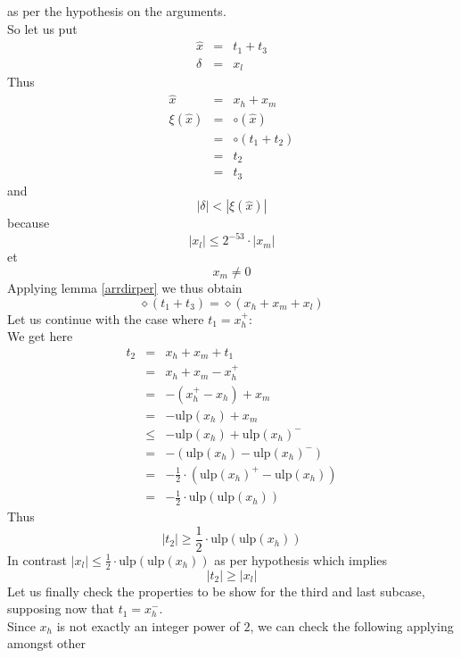 \documentclass[a4paper,10pt,twoside]{article}
\newenvironment{proof}[1][Proof]{\begin{trivlist}
\item[\hskip \labelsep {\bfseries #1}]}{\end{trivlist}}
\newcommand{\hi}{\ensuremath{\mathit{h}}}
\newcommand{\mi}{\ensuremath{\mathit{m}}}
\newcommand{\lo}{\ensuremath{\mathit{l}}}
\newcommand{\mUlp}{\ensuremath{\mathrm{ulp}}}
\begin{document}
\begin{proof}
as per the hypothesis on the arguments.  \\
So let us put
\begin{eqnarray*}
\hat{x} & = & t_1 + t_3 \\
\delta & = & x_\lo
\end{eqnarray*}
Thus
\begin{eqnarray*}
\hat{x} & = & x_\hi + x_\mi \\
\xi\left( \hat{x} \right) & = & \circ \left( \hat{x} \right) \\
& = & \circ \left( t_1 + t_2 \right) \\
& = & t_2 \\
& = & t_3
\end{eqnarray*}
and
$$\left \vert \delta \right \vert < \left \vert \xi\left( \hat{x} \right) \right \vert$$
because
$$\left \vert x_\lo \right \vert \leq 2^{-53} \cdot \left \vert x_\mi \right \vert$$
et $$x_\mi \not = 0$$
Applying lemma \ref{arrdirper} we thus obtain
$$\diamond \left( t_1 + t_3 \right) = \diamond \left( x_\hi + x_\mi + x_\lo \right)$$
Let us continue with the case where $t_1 = x_\hi^+$: \\
We get here
\begin{eqnarray*}
t_2 & = & x_\hi + x_\mi + t_1 \\
& = & x_\hi + x_\mi - x_\hi^+ \\
& = & - \left( x_\hi^+ - x_\hi \right) + x_\mi \\
& = & - \mUlp\left( x_\hi \right) + x_\mi \\
& \leq & -\mUlp\left( x_\hi \right) + \mUlp\left( x_\hi \right)^- \\
& = & - \left( \mUlp\left( x_\hi \right) - \mUlp\left( x_\hi \right)^- \right) \\
& = & - \frac{1}{2} \cdot \left( \mUlp\left( x_\hi \right)^+ - \mUlp\left( x_\hi \right) \right) \\
& = & - \frac{1}{2} \cdot \mUlp\left( \mUlp \left( x_\hi \right) \right)
\end{eqnarray*}
Thus
$$\left \vert t_2 \right \vert \geq \frac{1}{2} \cdot \mUlp\left( \mUlp \left( x_\hi \right) \right)$$
In contrast $\left \vert x_\lo \right \vert \leq \frac{1}{2} \cdot \mUlp\left( \mUlp \left( x_\hi \right) \right)$
as per hypothesis which implies
$$\left \vert t_2 \right \vert \geq \left \vert x_\lo \right \vert$$
Let us finally check the properties to be show for the third and last subcase, supposing now that
$t_1 = x_\hi^-$. \\
Since $x_\hi$ is not exactly an integer power of $2$, we can check the following applying amongst other

\end{proof}
\end{document}
